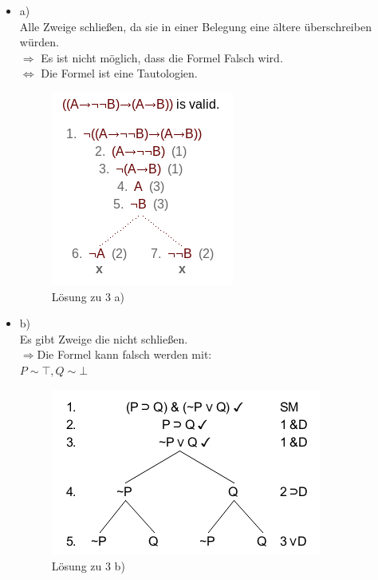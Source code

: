 \documentclass[a4paper]{scrartcl}
\begin{document}
\begin{itemize}
    \item a)\\

        Alle Zweige schließen, da sie in einer Belegung eine ältere überschreiben würden.\\
        $\Rightarrow$ Es ist nicht möglich, dass die Formel Falsch wird.\\
        $\Leftrightarrow$ Die Formel ist eine Tautologien.

        \begin{figure}[H]
            \centering
            \includegraphics[scale=0.6]{3-a-tree.png}
            \caption{Lösung zu 3 a)}
            \label{fig:}
        \end{figure}

\newpage

    \item b)\\

        Es gibt Zweige die nicht schließen.\\
        $\Rightarrow$Die Formel kann falsch werden mit:\\
        $P \sim \top, Q \sim \bot$

        \begin{figure}[H]
            \centering
            \includegraphics[scale=0.6]{3-b-tree.png}
            \caption{Lösung zu 3 b)}
            \label{fig:name}
        \end{figure}


\end{itemize}
\end{document}
